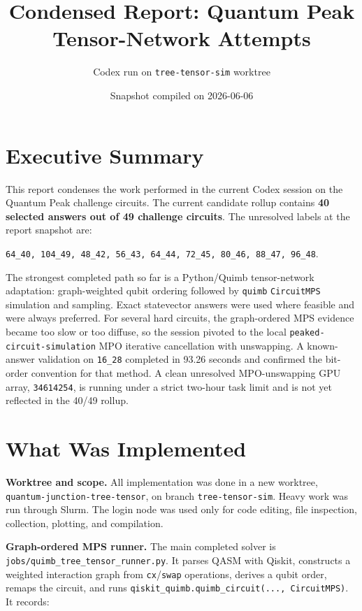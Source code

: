 \documentclass[10pt]{article}
\title{Condensed Report: Quantum Peak Tensor-Network Attempts}
\author{Codex run on \texttt{tree-tensor-sim} worktree}
\date{Snapshot compiled on 2026-06-06}
\begin{document}
\maketitle

\section*{Executive Summary}

This report condenses the work performed in the current Codex session on the Quantum Peak challenge circuits. The current candidate rollup contains \textbf{40 selected answers out of 49 challenge circuits}. The unresolved labels at the report snapshot are:

\begin{center}
\texttt{64\_40, 104\_49, 48\_42, 56\_43, 64\_44, 72\_45, 80\_46, 88\_47, 96\_48}.
\end{center}

The strongest completed path so far is a Python/Quimb tensor-network adaptation: graph-weighted qubit ordering followed by \texttt{quimb} \texttt{CircuitMPS} simulation and sampling. Exact statevector answers were used where feasible and were always preferred. For several hard circuits, the graph-ordered MPS evidence became too slow or too diffuse, so the session pivoted to the local \texttt{peaked-circuit-simulation} MPO iterative cancellation with unswapping. A known-answer validation on \texttt{16\_28} completed in 93.26 seconds and confirmed the bit-order convention for that method. A clean unresolved MPO-unswapping GPU array, \texttt{34614254}, is running under a strict two-hour task limit and is not yet reflected in the 40/49 rollup.

\section*{What Was Implemented}

\textbf{Worktree and scope.}
All implementation was done in a new worktree, \texttt{quantum-junction-tree-tensor}, on branch \texttt{tree-tensor-sim}. Heavy work was run through Slurm. The login node was used only for code editing, file inspection, collection, plotting, and compilation.

\textbf{Graph-ordered MPS runner.}
The main completed solver is \texttt{jobs/quimb\_tree\_tensor\_runner.py}. It parses QASM with Qiskit, constructs a weighted interaction graph from \texttt{cx}/\texttt{swap} operations, derives a qubit order, remaps the circuit, and runs \texttt{qiskit\_quimb.quimb\_circuit(..., CircuitMPS)}. It records:
\end{document}
